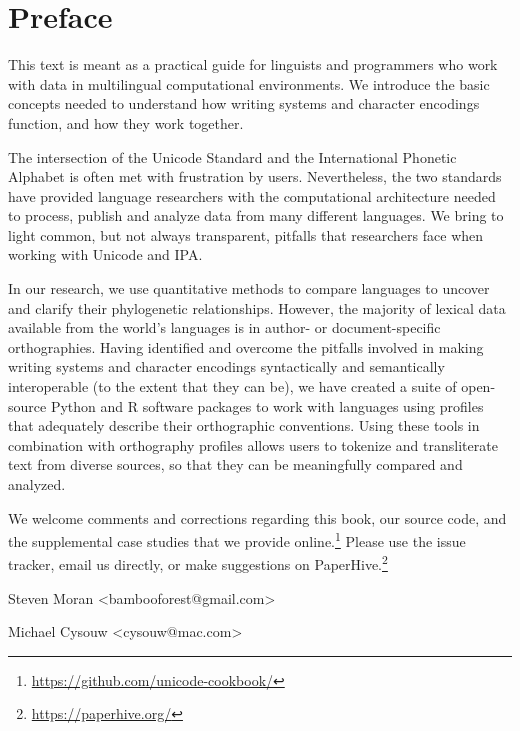 \chapter{Preface}
\label{preface}

This text is meant as a practical guide for linguists and programmers who work with data in multilingual computational environments. We introduce the basic concepts needed to understand how writing systems and character encodings function, and how they work together.

The intersection of the Unicode Standard and the International Phonetic Alphabet is often met with frustration by users. Nevertheless, the two standards have provided language researchers with the computational architecture needed to process, publish and analyze data from many different languages. We bring to light common, but not always transparent, pitfalls that researchers face when working with Unicode and IPA. 

In our research, we use quantitative methods to compare languages to uncover and clarify their phylogenetic relationships. However, the majority of lexical data available from the world's languages is in author- or document-specific orthographies. Having identified and overcome the pitfalls involved in making writing systems and character encodings syntactically and semantically interoperable (to the extent that they can be), we have created a suite of open-source Python and R software packages to work with languages using profiles that adequately describe their orthographic conventions. Using these tools in combination with orthography profiles allows users to tokenize and transliterate text from diverse sources, so that they can be meaningfully compared and analyzed.

We welcome comments and corrections regarding this book, our source code, and the supplemental case studies that we provide online.\footnote{\url{https://github.com/unicode-cookbook/}} Please use the issue tracker, email us directly, or make suggestions on PaperHive.\footnote{\url{https://paperhive.org/}}

\bigbreak
\noindent Steven Moran {\textless}bambooforest@gmail.com{\textgreater}

\noindent Michael Cysouw {\textless}cysouw@mac.com{\textgreater}
